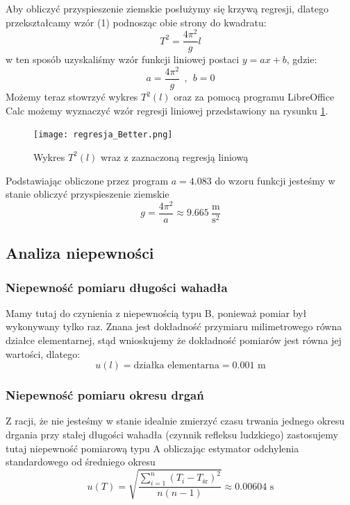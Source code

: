 \documentclass[a4paper,12pts]{article}
\begin{document}
	Aby obliczyć przyspieszenie ziemskie posłużymy się krzywą regresji, dlatego przekształcamy wzór (1)	podnosząc obie strony do kwadratu:
	\begin{equation}
		T^2 = \frac{4 \pi^2}{g} l
	\end{equation}
	w ten sposób uzyskaliśmy wzór funkcji liniowej postaci $y = ax + b$, gdzie:
	\begin{equation}
		a = \frac{4 \pi^2}{g}~~,~~b = 0
	\end{equation}
	Możemy teraz stowrzyć wykres $T^2(l)$ oraz za pomocą programu LibreOffice Calc możemy wyznaczyć wzór regresji liniowej przedstawiony na rysunku \ref{wykres:regresja}.
	\begin{figure}[!h]
		\centering
		\texttt{[image: regresja\_Better.png]}
		\caption{Wykres $T^2(l)$ wraz z zaznaczoną regresją liniową}
		\label{wykres:regresja}
	\end{figure}
	
	Podstawiając obliczone przez program $a = 4.083$ do wzoru funkcji jesteśmy w stanie obliczyć przyspieszenie ziemskie
	\begin{equation}
		g = \frac{4 \pi ^ 2}{a} \approx 9.665 ~\frac{\textrm{m}}{\textrm{s}^2}  
	\end{equation}
	
	\subsection{Analiza niepewności}
	\label{analiza_niepewnosci}
	
	\subsubsection{Niepewność pomiaru długości wahadła}
	Mamy tutaj do czynienia z niepewnością typu B, ponieważ pomiar był wykonywany tylko raz. Znana jest dokładność przymiaru milimetrowego równa działce elementarnej, stąd wnioskujemy że dokładność pomiarów jest równa jej wartości, dlatego:
	\begin{equation}
		u(l) = \textrm{działka elementarna} = 0.001 \textrm{ m}
	\end{equation}
	
	\subsubsection{Niepewność pomiaru okresu drgań}
	Z racji, że nie jesteśmy w stanie idealnie zmierzyć czasu trwania jednego okresu drgania przy stałej długości wahadła (czynnik refleksu ludzkiego) zastosujemy tutaj niepewność pomiarową typu A obliczając estymator odchylenia standardowego od średniego okresu
	\begin{equation}
		u(T) = \sqrt{\frac{\sum_{i=1}^{n}(T_i - T_{\textrm{śr}})^2}{n(n-1)}} \approx 0.00604 \textrm{ s}
	\end{equation}
	
\end{document}
